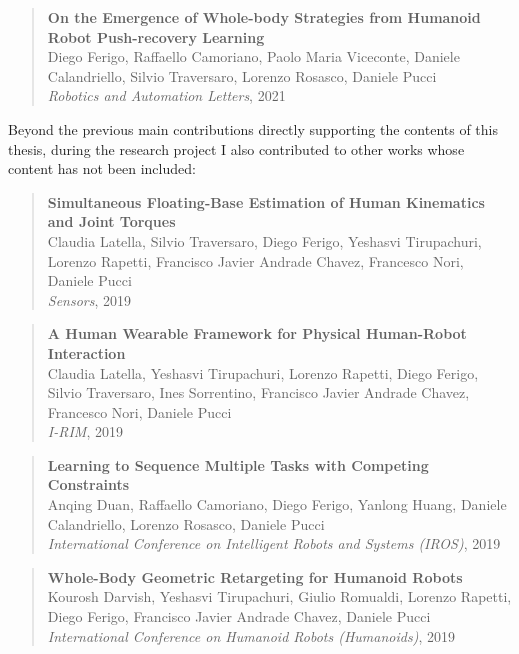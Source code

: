 \begin{quote}
    \onehalfspacing
    \textbf{On the Emergence of Whole-body Strategies from Humanoid Robot Push-recovery Learning} \\[0.75mm]
    Diego Ferigo, Raffaello Camoriano, Paolo Maria Viceconte, Daniele Calandriello, Silvio Traversaro, Lorenzo Rosasco, Daniele Pucci \\[0.75mm]
    \textit{Robotics and Automation Letters}, 2021
\end{quote}

\noindent
Beyond the previous main contributions directly supporting the contents of this thesis, during the research project I also contributed to other works whose content has not been included:

\begin{quote}
    \onehalfspacing
    \textbf{Simultaneous Floating-Base Estimation of Human Kinematics and Joint Torques} \\[0.75mm]
     Claudia Latella, Silvio Traversaro, Diego Ferigo, Yeshasvi Tirupachuri, Lorenzo Rapetti, Francisco Javier Andrade Chavez, Francesco Nori, Daniele Pucci \\[0.75mm]
    \textit{Sensors}, 2019
\end{quote}

\begin{quote}
    \onehalfspacing
    \textbf{A Human Wearable Framework for Physical Human-Robot Interaction} \\[0.75mm]
     Claudia Latella, Yeshasvi Tirupachuri, Lorenzo Rapetti, Diego Ferigo, Silvio Traversaro, Ines Sorrentino, Francisco Javier Andrade Chavez, Francesco Nori, Daniele Pucci \\[0.75mm]
    \textit{I-RIM}, 2019
\end{quote}

\begin{quote}
    \onehalfspacing
    \textbf{Learning to Sequence Multiple Tasks with Competing Constraints} \\[0.75mm]
     Anqing Duan, Raffaello Camoriano, Diego Ferigo, Yanlong Huang, Daniele Calandriello, Lorenzo Rosasco, Daniele Pucci \\[0.75mm]
    \textit{International Conference on Intelligent Robots and Systems (IROS)}, 2019
\end{quote}

\begin{quote}
    \onehalfspacing
    \textbf{Whole-Body Geometric Retargeting for Humanoid Robots} \\[0.75mm]
    Kourosh Darvish, Yeshasvi Tirupachuri, Giulio Romualdi, Lorenzo Rapetti, Diego Ferigo, Francisco Javier Andrade Chavez, Daniele Pucci \\[0.75mm]
    \textit{International Conference on Humanoid Robots (Humanoids)}, 2019
\end{quote}

